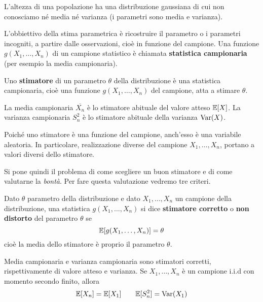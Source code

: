 \begin{example}
	L'altezza di una popolazione ha una distribuzione gaussiana di cui non conosciamo né media né
	varianza (i parametri sono media e varianza).
\end{example}

L'obbiettivo della stima parametrica è ricostruire il parametro o i parametri incogniti, a partire
dalle osservazioni, cioè in funzione del campione. Una funzione $g(X_1, \dots, X_n)$ di un campione
statistico è chiamata \textbf{statistica campionaria} (per esempio la media campionaria).

Uno \textbf{stimatore} di un parametro $\theta$ della distribuzione è una statistica campionaria,
cioè una funzione $g(X_1, \dots, X_n)$ del campione, atta a stimare $\theta$.

\begin{example}
	La media campionaria $\overline{X_n}$ è lo stimatore abituale del valore atteso $\mathbb{E}[X]$. La
	varianza campionaria $S_n^2$ è lo stimatore abituale della varianza $\operatorname{Var}(X)$.
\end{example}

\begin{observation}
	Poiché uno stimatore è una funzione del campione, anch'esso è una variabile aleatoria. In
	particolare, realizzazione diverse del campione $X_1, \dots, X_n$, portano a valori diversi
	dello stimatore.
\end{observation}

Si pone quindi il problema di come scegliere un buon stimatore e di come valutarne la \emph{bontà}.
Per fare questa valutazione vedremo tre criteri.

\begin{definition}
	Dato $\theta$ parametro della distribuzione e dato $X_1, \dots, X_n$ un campione della
	distribuzione, una statistica $g(X_1, \dots, X_n)$ si dice \textbf{stimatore corretto} o
	\textbf{non distorto} del parametro $\theta$ se
	\[ \mathbb{E}[g(X_1, \dots, X_n)] = \theta \]
	cioè la media dello stimatore è proprio il parametro $\theta$.
\end{definition}

\begin{proposition}
	Media campionaria e varianza campionaria sono stimatori corretti, rispettivamente di valore
	atteso e varianza. Se $X_1, \dots, X_n$ è un campione i.i.d con momento secondo finito, allora
	\[ \mathbb{E}[X_n] = \mathbb{E}[X_1] \quad \quad \mathbb{E}[S_n^2] = \operatorname{Var}(X_1) \]
\end{proposition}

